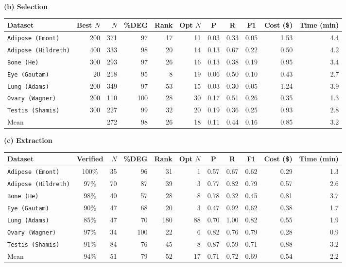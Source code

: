 \documentclass[10pt,twocolumn]{article}
\theoremstyle{plain}
\theoremstyle{definition}
\theoremstyle{remark}
\begin{document}
\begin{table}[ht!]
  
  \vspace{8pt}
  \textbf{(b) Selection}
  \vspace{2pt}
  
  \begin{tabular}{@{}l r r rrr ccc r r@{}}
  \toprule
  Dataset & Best $N$ & $N$ & \%DEG & Rank & Opt $N$ & P & R & F1 & Cost (\$) & Time (min) \\
  \midrule
  \texttt{Adipose (Emont)}    & 200 & 371 &  97 & 17 & 11 & 0.03 & 0.33 & 0.05 & 1.53 &  4.4 \\
  \texttt{Adipose (Hildreth)} & 400 & 333 &  98 & 20 & 14 & 0.13 & 0.67 & 0.22 & 0.50 &  4.2 \\
  \texttt{Bone (He)}          & 300 & 293 &  97 & 26 & 16 & 0.13 & 0.38 & 0.19 & 0.95 &  3.4 \\
  \texttt{Eye (Gautam)}       &  20 & 218 &  95 &  8 & 19 & 0.06 & 0.50 & 0.10 & 0.43 &  2.7 \\
  \texttt{Lung (Adams)}       & 200 & 349 &  97 & 53 & 15 & 0.03 & 0.30 & 0.05 & 1.24 &  3.9 \\
  \texttt{Ovary (Wagner)}     & 200 & 110 & 100 & 28 & 30 & 0.17 & 0.51 & 0.26 & 0.35 &  1.3 \\
  \texttt{Testis (Shamis)}    & 300 & 227 &  99 & 32 & 20 & 0.19 & 0.36 & 0.25 & 0.93 &  2.8 \\
  \midrule
  Mean               &     & 272 &  98 & 26 & 18 & 0.11 & 0.44 & 0.16 & 0.85 &  3.2 \\
  \bottomrule
  \end{tabular}

  \vspace{8pt}
  \textbf{(c) Extraction}
  \vspace{2pt}

  \begin{tabular}{@{}l c r rrr ccc r r@{}}
  \toprule
  Dataset & Verified & $N$ & \%DEG & Rank & Opt $N$ & P & R & F1 & Cost (\$) & Time (min) \\
  \midrule
  \texttt{Adipose (Emont)}    & 100\% &  35 & 96 &  31 &  1 & 0.57 & 0.67 & 0.62 & 0.29 & 1.3 \\
  \texttt{Adipose (Hildreth)} &  97\% &  70 & 87 &  39 &  3 & 0.77 & 0.82 & 0.79 & 0.57 & 2.6 \\
  \texttt{Bone (He)}          &  98\% &  40 & 57 &  28 &  8 & 0.78 & 0.32 & 0.45 & 0.81 & 3.7 \\
  \texttt{Eye (Gautam)}       &  90\% &  47 & 68 &  20 &  3 & 0.47 & 0.92 & 0.62 & 0.38 & 1.7 \\
  \texttt{Lung (Adams)}       &  85\% &  47 & 70 & 180 & 88 & 0.70 & 1.00 & 0.82 & 0.55 & 1.9 \\
  \texttt{Ovary (Wagner)}     &  97\% &  34 &100 &  22 &  6 & 0.82 & 0.76 & 0.79 & 0.28 & 0.9 \\
  \texttt{Testis (Shamis)}    &  91\% &  84 & 76 &  45 &  8 & 0.87 & 0.59 & 0.71 & 0.88 & 3.2 \\
  \midrule
  Mean               &  94\% &  51 & 79 &  52 & 17 & 0.71 & 0.72 & 0.69 & 0.54 &  2.2 \\
  \bottomrule
  \end{tabular}
\end{table}
\end{document}
